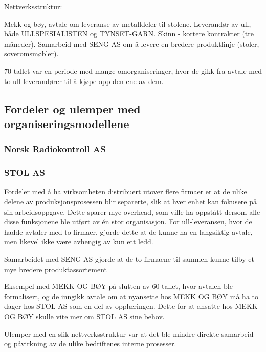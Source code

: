Nettverksstruktur:

Mekk og bøy, avtale om leveranse av metalldeler til stolene.
Leverandør av ull, både ULLSPESIALISTEN og TYNSET-GARN.
Skinn - kortere kontrakter (tre måneder).
Samarbeid med SENG AS om å levere en bredere produktlinje (stoler, soveromsmøbler).

70-tallet var en periode med mange omorganiseringer, hvor de gikk fra avtale med to ull-leverandører til å kjøpe opp den ene av dem.

\subsection{Fordeler og ulemper med organiseringsmodellene}

\subsubsection{Norsk Radiokontroll AS}


\subsubsection{STOL AS}

Fordeler med å ha virksomheten distribuert utover flere firmaer er at de ulike delene av produksjonsprosessen blir separerte, slik at hver enhet kan fokusere på sin arbeidsoppgave.
Dette sparer mye overhead, som ville ha oppstått dersom alle disse funksjonene ble utført av én stor organisasjon.
For ull-leveransen, hvor de hadde avtaler med to firmaer, gjorde dette at de kunne ha en langsiktig avtale, men likevel ikke være avhengig av kun ett ledd.

Samarbeidet med SENG AS gjorde at de to firmaene til sammen kunne tilby et mye bredere produktassortement

Eksempel med MEKK OG BØY på slutten av 60-tallet, hvor avtalen ble formalisert, og de inngikk avtale om at nyansette hos MEKK OG BØY må ha to dager hos STOL AS som en del av opplæringen.
Dette for at ansatte hos MEKK OG BØY skulle vite mer om STOL AS sine behov.

Ulemper med en slik nettverksstruktur var at det ble mindre direkte samarbeid og påvirkning av de ulike bedriftenes interne prosesser.
